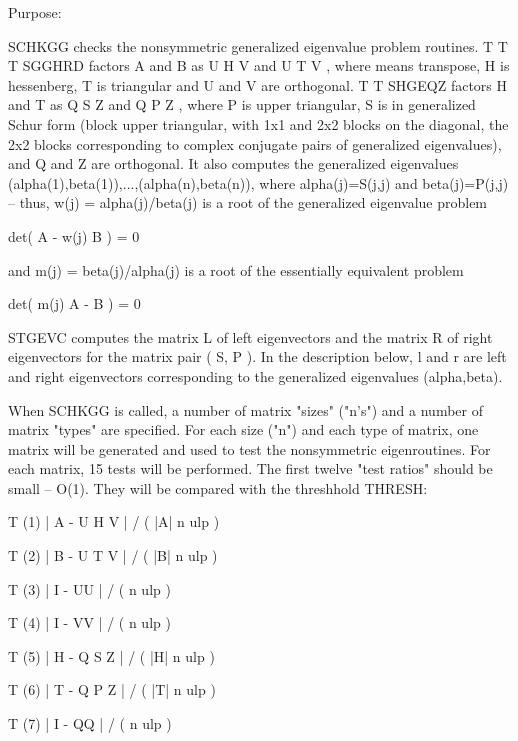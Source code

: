 \begin{DoxyParagraph}{Purpose\+: }
\begin{DoxyVerb} SCHKGG  checks the nonsymmetric generalized eigenvalue problem
 routines.
                                T          T        T
 SGGHRD factors A and B as U H V  and U T V , where   means
 transpose, H is hessenberg, T is triangular and U and V are
 orthogonal.
                                 T          T
 SHGEQZ factors H and T as  Q S Z  and Q P Z , where P is upper
 triangular, S is in generalized Schur form (block upper triangular,
 with 1x1 and 2x2 blocks on the diagonal, the 2x2 blocks
 corresponding to complex conjugate pairs of generalized
 eigenvalues), and Q and Z are orthogonal.  It also computes the
 generalized eigenvalues (alpha(1),beta(1)),...,(alpha(n),beta(n)),
 where alpha(j)=S(j,j) and beta(j)=P(j,j) -- thus,
 w(j) = alpha(j)/beta(j) is a root of the generalized eigenvalue
 problem

     det( A - w(j) B ) = 0

 and m(j) = beta(j)/alpha(j) is a root of the essentially equivalent
 problem

     det( m(j) A - B ) = 0

 STGEVC computes the matrix L of left eigenvectors and the matrix R
 of right eigenvectors for the matrix pair ( S, P ).  In the
 description below,  l and r are left and right eigenvectors
 corresponding to the generalized eigenvalues (alpha,beta).

 When SCHKGG is called, a number of matrix "sizes" ("n's") and a
 number of matrix "types" are specified.  For each size ("n")
 and each type of matrix, one matrix will be generated and used
 to test the nonsymmetric eigenroutines.  For each matrix, 15
 tests will be performed.  The first twelve "test ratios" should be
 small -- O(1).  They will be compared with the threshhold THRESH:

                  T
 (1)   | A - U H V  | / ( |A| n ulp )

                  T
 (2)   | B - U T V  | / ( |B| n ulp )

               T
 (3)   | I - UU  | / ( n ulp )

               T
 (4)   | I - VV  | / ( n ulp )

                  T
 (5)   | H - Q S Z  | / ( |H| n ulp )

                  T
 (6)   | T - Q P Z  | / ( |T| n ulp )

               T
 (7)   | I - QQ  | / ( n ulp )


\end{DoxyVerb}
\end{DoxyParagraph}
